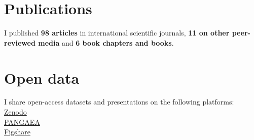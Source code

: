 \documentclass[%
               doublesided,
               paper=a4,
               fontsize=10pt
              ]{my-resume}
\begin{document}
{     \section[\faBook]{Publications}
     {\small I published \textbf{98 articles} in international scientific journals, \textbf{11 on other peer-reviewed media} and \textbf{6 book chapters and books}.} 
     \smallskip

    \section[\faUnlock]{Open data}
    {\small I share open-access datasets and presentations on the following platforms:}\\
    \faExternalLink \hspace{0.5em} \href{https://zenodo.org/search?page=1&size=20&q=creators.orcid:(0000-0001-5575-1168)&sort=mostrecent}{Zenodo}\\
    \faExternalLink \hspace{0.5em} \href{https://www.pangaea.de/?q=Rovere\%2C+Alessio&f.author\%5B\%5D=Rovere\%2C+Alessio}{PANGAEA}\\
    \faExternalLink \hspace{0.5em} \href{https://figshare.com/authors/Alessio_Rovere/1379355}{Figshare}}
\end{document}
